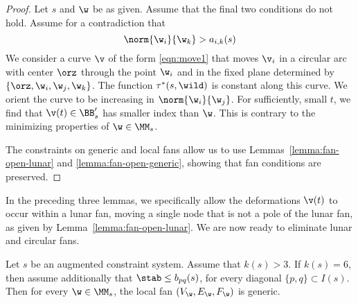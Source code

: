 \begin{proof} Let $s$ and $\w$ be as given.  Assume that the final
two conditions do not hold.
Assume for a contradiction that 
\[
\norm{\w_i}{\w_k}>a_{i,k}(s)
\]
We consider a curve $\v$ of the form \eqref{eqn:move1} that moves $\v_i$
in a circular arc with center $\orz$ through the point $\w_i$ and in
the fixed plane determined by $\{\orz,\w_i,\w_j,\w_{k}\}$.  
The function $\tau^*(s,\wild)$ is
constant along this curve.  We orient the curve to be increasing
in $\norm{\w_i}{\w_{j}}$.  For sufficiently, small $t$, we find that
$\v(t)\in\BB'_s$ has smaller index than $\w$.  This is contrary to the minimizing
properties of $\w\in\MM_s$.

The constraints on generic and local fans
allow us to use Lemmas~\ref{lemma:fan-open-lunar} and
\ref{lemma:fan-open-generic}, showing that fan conditions are preserved.
\end{proof}

In the preceding three lemmas, we specifically allow the deformations
$\v(t)$ to occur within a lunar fan, moving a single node that is not a pole
of the lunar fan, as given by Lemma~\ref{lemma:fan-open-lunar}.
We are now ready to eliminate  lunar and circular
fans.


\begin{lemma} Let $s$ be an augmented constraint system.
Assume that $k(s)>3$.
If $k(s)=6$, then assume additionally that
$\stab\le b_{pq}(s)$, for every diagonal $\{p,q\}\subset I(s)$.
Then for every  $\w\in\MM_s$,  the local fan $(V_\w,E_\w,F_\w)$ is generic.
\end{lemma}

